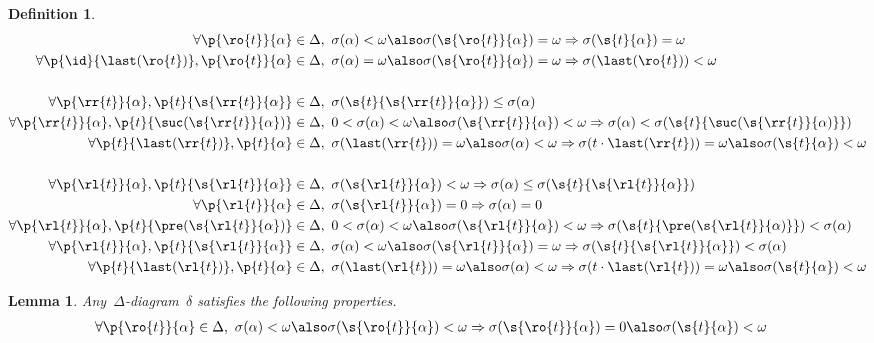 \documentclass{scrartcl}
\newtheorem{lemma}{Lemma}[section]
\theoremstyle{definition}
\newtheorem{definition}{Definition}[section]
\begin{document}
\begin{definition}
\begin{align}
    \forall \p{\ro{t}}{\alpha} \in \Delta
    &, ~
    \sigma(\alpha) < \omega \also \sigma(\s{\ro{t}}{\alpha}) = \omega
    \Rightarrow
    \sigma(\s{t}{\alpha}) = \omega
    \\
    \forall  \p{\id}{\last(\ro{t})}, \p{\ro{t}}{\alpha} \in \Delta
    &, ~
    \sigma(\alpha) = \omega \also \sigma(\s{\ro{t}}{\alpha}) = \omega
    \Rightarrow
    \sigma(\last(\ro{t})) < \omega
    \\
    \\
    \forall \p{\rr{t}}{\alpha}, \p{t}{\s{\rr{t}}{\alpha}} \in \Delta
    &, ~
    \sigma(\s{t}{\s{\rr{t}}{\alpha}}) \le \sigma(\alpha)
    \\
    \forall \p{\rr{t}}{\alpha}, \p{t}{\suc(\s{\rr{t}}{\alpha} )}\in \Delta
    &, ~
    0<\sigma(\alpha) < \omega \also \sigma(\s{\rr{t}}{\alpha}) < \omega
    \Rightarrow
    \sigma(\alpha) < \sigma(\s{t}{{\suc(\s{\rr{t}}{\alpha)}}})
    \\
     \forall \p{t}{\last(\rr{t})}, \p{t}{\alpha}\in \Delta
    &, ~
    \sigma(\last(\rr{t})) = \omega \also \sigma(\alpha) < \omega
    \Rightarrow
    \sigma(t\cdot \last(\rr{t})) = \omega \also \sigma(\s{t}{\alpha}) < \omega
    \\
    \\
    \forall \p{\rl{t}}{\alpha}, \p{t}{\s{\rl{t}}{\alpha}} \in \Delta
    &, ~
    \sigma(\s{\rl{t}}{\alpha}) < \omega
    \Rightarrow
    \sigma(\alpha)  \le \sigma(\s{t}{\s{\rl{t}}{\alpha}})
    \\
    \forall \p{\rl{t}}{\alpha} \in \Delta
    &, ~
    \sigma(\s{\rl{t}}{\alpha}) = 0
    \Rightarrow
    \sigma(\alpha) = 0
    \\
    \forall \p{\rl{t}}{\alpha}, \p{t}{\pre(\s{\rl{t}}{\alpha} )}\in \Delta
    &, ~
    0<\sigma(\alpha) < \omega \also \sigma(\s{\rl{t}}{\alpha}) < \omega
    \Rightarrow
    \sigma(\s{t}{{\pre(\s{\rl{t}}{\alpha)}}})<  \sigma(\alpha)
    \\
    \forall \p{\rl{t}}{\alpha}, \p{t}{\s{\rl{t}}{\alpha}} \in \Delta
    &, ~
    \sigma(\alpha) < \omega \also \sigma(\s{\rl{t}}{\alpha}) = \omega
    \Rightarrow
    \sigma(\s{t}{\s{\rl{t}}{\alpha}})  < \sigma(\alpha)
    \\
      \forall \p{t}{\last(\rl{t})}, \p{t}{\alpha}\in \Delta
    &, ~
    \sigma(\last(\rl{t})) = \omega \also \sigma(\alpha) < \omega
    \Rightarrow
    \sigma(t\cdot \last(\rl{t})) = \omega \also \sigma(\s{t}{\alpha}) < \omega
  \end{align}
\end{definition}

\begin{lemma}
  Any~$\Delta$-diagram~$\delta$ satisfies the following properties.
  \begin{align}
    \forall \p{\ro{t}}{\alpha} \in \Delta
    &, ~
    \sigma(\alpha) < \omega \also \sigma(\s{\ro{t}}{\alpha}) < \omega
    \Rightarrow
    \sigma(\s{\ro{t}}{\alpha}) = 0  \also \sigma(\s{t}{\alpha}) < \omega
  \end{align}
\end{lemma}
\end{document}
